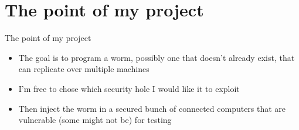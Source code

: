 \documentclass[11pt]{beamer}
\begin{document}
\section{The point of my project}
\begin{frame}{The point of my project}
\begin{itemize}
\item The goal is to program a worm, possibly one that doesn't already exist, that can replicate over multiple machines
\item I'm free to chose which security hole I would like it to exploit
\item Then inject the worm in a secured bunch of connected computers that are vulnerable (some might not be) for testing 
\end{itemize}
\end{frame}
\end{document}
